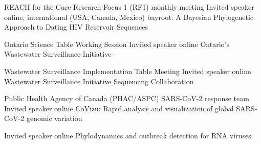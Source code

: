 {REACH for the Cure Research Focus 1 (RF1) monthly meeting}
{Invited speaker}
{}{online, international (USA, Canada, Mexico)}
{bayroot: A Bayesian Phylogenetic Approach to Dating HIV Reservoir Sequences}

{Ontario Science Table Working Session}
{Invited speaker}
{}{online}
{Ontario's Wastewater Surveillance Initiative}


{Wastewater Surveillance Implementation Table Meeting}
{Invited speaker}
{}{online}
{Wastewater Surveillance Initiative Sequencing Collaboration}


{Public Health Agency of Canada (PHAC/ASPC) SARS-CoV-2 response team}
{Invited speaker}
{}{online}
{CoVizu: Rapid analysis and visualization of global SARS-CoV-2 genomic variation}

{Invited speaker}
{}{online}
{Phylodynamics and outbreak detection for RNA viruses}



